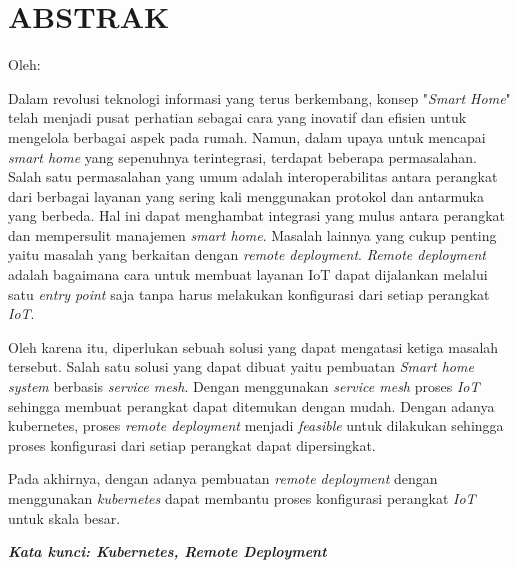\clearpage
\chapter*{ABSTRAK}
\begin{center}
  \center
  \begin{singlespace}
    \large\bfseries\MakeUppercase{\thetitle}
    
    \normalfont\normalsize
    Oleh:
    
    \bfseries \theauthor
  \end{singlespace}
\end{center}

\begin{singlespace}
  \small
  Dalam revolusi teknologi informasi yang terus berkembang, konsep "\textit{Smart Home}" telah menjadi pusat perhatian sebagai cara yang inovatif dan efisien untuk mengelola berbagai aspek pada rumah. Namun, dalam upaya untuk mencapai \textit{smart home} yang sepenuhnya terintegrasi, terdapat beberapa permasalahan. Salah satu permasalahan yang umum adalah interoperabilitas antara perangkat dari berbagai layanan yang sering kali menggunakan protokol dan antarmuka yang berbeda. Hal ini dapat menghambat integrasi yang mulus antara perangkat dan mempersulit manajemen \textit{smart home}. Masalah lainnya yang cukup penting yaitu masalah yang berkaitan dengan \textit{remote deployment}. \textit{Remote deployment} adalah bagaimana cara untuk membuat layanan IoT dapat dijalankan melalui satu \textit{entry point} saja tanpa harus melakukan konfigurasi dari setiap perangkat \textit{IoT}. 
  
  Oleh karena itu, diperlukan sebuah solusi yang dapat mengatasi ketiga masalah tersebut. Salah satu solusi yang dapat dibuat yaitu pembuatan \textit{Smart home system} berbasis \textit{service mesh}. Dengan menggunakan \textit{service mesh} proses \textit{IoT} sehingga membuat perangkat dapat ditemukan dengan mudah. Dengan adanya kubernetes, proses \textit{remote deployment} menjadi \textit{feasible} untuk dilakukan sehingga proses konfigurasi dari setiap perangkat dapat dipersingkat.
  
  Pada akhirnya, dengan adanya pembuatan \textit{remote deployment} dengan menggunakan \textit{kubernetes} dapat membantu proses konfigurasi perangkat \textit{IoT} untuk skala besar.
  
  \textbf{\textit{Kata kunci: Kubernetes, Remote Deployment}}
  
\end{singlespace}
\clearpage